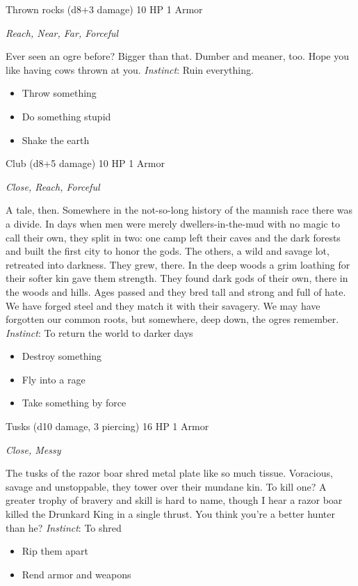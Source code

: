 \HRule
{}

Thrown rocks (d8+3 damage)\hspace*{\fill} 10 HP 1 Armor

\emph{Reach, Near, Far, Forceful}

\HRule
Ever seen an ogre before? Bigger than that. Dumber and meaner, too. Hope you like having cows thrown at you. \emph{Instinct}: Ruin everything.
\begin{itemize}
\item Throw something
\item Do something stupid
\item Shake the earth
\end{itemize}

\HRule
{}

Club (d8+5 damage)\hspace*{\fill} 10 HP 1 Armor

\emph{Close, Reach, Forceful}

\HRule
A tale, then. Somewhere in the not-so-long history of the mannish race there was a divide. In days when men were merely dwellers-in-the-mud with no magic to call their own, they split in two: one camp left their caves and the dark forests and built the first city to honor the gods. The others, a wild and savage lot, retreated into darkness. They grew, there. In the deep woods a grim loathing for their softer kin gave them strength. They found dark gods of their own, there in the woods and hills. Ages passed and they bred tall and strong and full of hate. We have forged steel and they match it with their savagery. We may have forgotten our common roots, but somewhere, deep down, the ogres remember. \emph{Instinct}: To return the world to darker days
\begin{itemize}
\item Destroy something
\item  Fly into a rage
\item  Take something by force
\end{itemize}
\newpage
\HRule
{}

Tusks (d10 damage, 3 piercing)\hspace*{\fill} 16 HP 1 Armor

\emph{Close, Messy}

\HRule
The tusks of the razor boar shred metal plate like so much tissue. Voracious, savage and unstoppable, they tower over their mundane kin. To kill one? A greater trophy of bravery and skill is hard to name, though I hear a razor boar killed the Drunkard King in a single thrust. You think you're a better hunter than he? \emph{Instinct}: To shred
\begin{itemize}
\item Rip them apart
\item Rend armor and weapons
\end{itemize}

